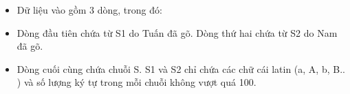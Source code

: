 \begin{itemize}
	\item     Dữ liệu vào gồm 3 dòng, trong đó:   
	\item     Dòng đầu tiên chứa từ S1 do Tuấn đã gõ. Dòng thứ hai chứa từ S2 do Nam đã gõ.   
	\item     Dòng cuối cùng chứa chuỗi S. S1 và S2 chỉ chứa các chữ cái latin (a, A, b, B.. ) và số lượng ký tự trong mỗi chuỗi không vượt quá 100.   
\end{itemize}